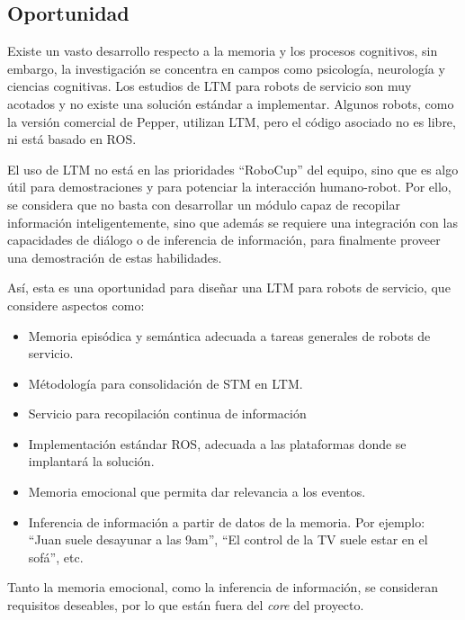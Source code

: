 \subsection{Oportunidad}

Existe un vasto desarrollo respecto a la memoria y los procesos cognitivos, sin embargo, la investigaci\'on se concentra en campos como psicolog\'ia, neurolog\'ia y ciencias cognitivas. Los estudios de LTM para robots de servicio son muy acotados y no existe una soluci\'on est\'andar a implementar. Algunos robots, como la versi\'on comercial de Pepper, utilizan LTM, pero el c\'odigo asociado no es libre, ni est\'a basado en ROS.

El uso de LTM no est\'a en las prioridades ``RoboCup'' del equipo, sino que es algo \'util para demostraciones y para potenciar la interacci\'on humano-robot. Por ello, se considera que no basta con desarrollar un m\'odulo capaz de recopilar informaci\'on inteligentemente, sino que adem\'as se requiere una integraci\'on con las capacidades de di\'alogo o de inferencia de informaci\'on, para finalmente proveer una demostraci\'on de estas habilidades.

As\'i, esta es una oportunidad para dise\~nar una LTM para robots de servicio, que considere aspectos como: 
\begin{itemize}
\item Memoria epis\'odica y sem\'antica adecuada a tareas generales de robots de servicio.
\item M\'etodolog\'ia para consolidaci\'on de STM en LTM.
\item Servicio para recopilaci\'on continua de informaci\'on
\item Implementaci\'on est\'andar ROS, adecuada a las plataformas donde se implantar\'a la soluci\'on.
\item Memoria emocional que permita dar relevancia a los eventos.
\item Inferencia de informaci\'on a partir de datos de la memoria. Por ejemplo: ``Juan suele desayunar a las 9am'', ``El control de la TV suele estar en el sof\'a'', etc.
\end{itemize}

Tanto la memoria emocional, como la inferencia de informaci\'on, se consideran requisitos deseables, por lo que est\'an fuera del \textit{core} del proyecto.

